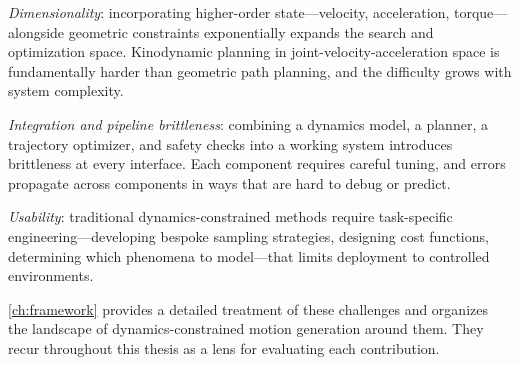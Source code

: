 \textit{Dimensionality}: incorporating higher-order state---velocity, acceleration, torque---alongside geometric constraints exponentially expands the search and optimization space.
Kinodynamic planning in joint-velocity-acceleration space is fundamentally harder than geometric path planning, and the difficulty grows with system complexity.

\textit{Integration and pipeline brittleness}: combining a dynamics model, a planner, a trajectory optimizer, and safety checks into a working system introduces brittleness at every interface.
Each component requires careful tuning, and errors propagate across components in ways that are hard to debug or predict.

\textit{Usability}: traditional dynamics-constrained methods require task-specific engineering---developing bespoke sampling strategies, designing cost functions, determining which phenomena to model---that limits deployment to controlled environments.

\cref{ch:framework} provides a detailed treatment of these challenges and organizes the landscape of dynamics-constrained motion generation around them.
They recur throughout this thesis as a lens for evaluating each contribution.
